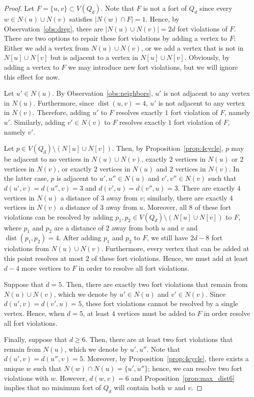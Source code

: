 \documentclass[10pt,a4paper]{amsart}
\newcommand\abs[1]{\left|#1\right|}
\newcommand\dist[2]{\operatorname{dist}\left(#1,#2\right)}
\begin{document}
\begin{proof}
Let $F=\{u,v\}\subset V(Q_{d})$.
Note that $F$ is not a fort of $Q_{d}$ since every $w\in N(u)\cup N(v)$ satisfies $\abs{N(w)\cap F}=1$. 
Hence, by Observation~\ref{obs:dreg}, there are $\abs{N(u)\cup N(v)}=2d$ fort violations of $F$.
There are two options to repair these fort violations by adding a vertex to $F$: Either we add a vertex from $N(u)\cup N(v)$, or we add a vertex that is not in $N[u]\cup N[v]$ but is adjacent to a vertex in $N[u]\cup N[v]$.
Obviously, by adding a vertex to $F$ we may introduce new fort violations, but we will ignore this effect for now.

Let $u'\in N(u)$.
By Observation~\ref{obs:neighbors}, $u'$ is not adjacent to any vertex in $N(u)$.
Furthermore, since $\dist{u}{v}=4$, $u'$ is not adjacent to any vertex in $N(v)$. 
Therefore, adding $u'$ to $F$ resolves exactly $1$ fort violation of $F$, namely $u'$.
Similarly, adding $v'\in N(v)$ to $F$ resolves exactly $1$ fort violation of $F$, namely $v'$. 

Let $p\in V(Q_{d})\setminus\left(N[u]\cup N[v]\right)$.
Then, by Proposition~\ref{prop:4cycle}, $p$ may be adjacent to no vertices in $N(u)\cup N(v)$, exactly $2$ vertices in $N(u)$ or $2$ vertices in $N(v)$, or exactly $2$ vertices in $N(u)$ and $2$ vertices in $N(v)$. 
In the latter case, $p$ is adjacent to $u',u''\in N(u)$ and $v',v''\in N(v)$ such that $d(u',v)=d(u'',v)=3$ and $d(v',u)=d(v'',u)=3$.
There are exactly $4$ vertices in $N(u)$ a distance of $3$ away from $v$; similarly, there are exactly $4$ vertices in $N(v)$ a distance of $3$ away from $u$.
Moreover, all $8$ of these fort violations can be resolved by adding $p_{1},p_{2}\in V(Q_{d})\setminus\left(N[u]\cup N[v]\right)$ to $F$, where $p_{1}$ and $p_{2}$ are a distance of $2$ away from both $u$ and $v$ and $\dist{p_{1}}{p_{2}}=4$.
After adding $p_{1}$ and $p_{2}$ to $F$, we still have $2d-8$ fort violations from $N(u)\cup N(v)$.
Furthermore, every vertex that can be added at this point resolves at most $2$ of these fort violations.
Hence, we must add at least $d-4$ more vertices to $F$ in order to resolve all fort violations.

Suppose that $d=5$.
Then, there are exactly two fort violations that remain from $N(u)\cup N(v)$, which we denote by $u'\in N(u)$ and $v'\in N(v)$.
Since $d(u',v)=d(v',u)=5$, these fort violations cannot be resolved by a single vertex. 
Hence, when $d=5$, at least $4$ vertices must be added to $F$ in order resolve all fort violations. 

Finally, suppose that $d\geq 6$. 
Then, there are at least two fort violations that remain from $N(u)$, which we denote by $u',u''$.
Note that $d(u',v)=d(u'',v)=5$. 
Moreover, by Proposition~\ref{prop:4cycle}, there exists a unique $w$ such that $N(w)\cap N(u)=\{u',u''\}$; hence, we can resolve two fort violations with $w$.
However, $d(w,v)=6$ and Proposition~\ref{prop:max_dist6} implies that no minimum fort of $Q_{d}$ will contain both $w$ and $v$.
\end{proof}
\end{document}
